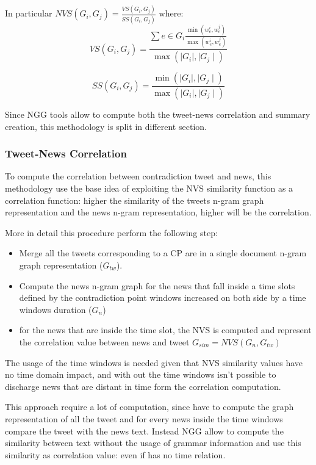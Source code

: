 In particular $NVS(G_i,G_j) = \frac{VS(G_i,G_j)}{SS(G_i,G_j)}$ where:
\begin{equation}
 VS(G_i,G_j)=\frac{\sum e \in G_i \frac{\min(w_e^i, w_e^j)}{\max(w_e^i, w_e^j)}}{\max(\mid G_i \mid, \mid G_j \mid)}
\end{equation}

\begin{equation}
 SS(G_i,G_j)=\frac{\min(\mid G_i \mid, \mid G_j \mid)}{\max(\mid G_i \mid, \mid G_j \mid)}
\end{equation}

Since NGG tools allow to compute both the tweet-news correlation and summary creation, this methodology is split in different section.

\subsubsection*{Tweet-News Correlation}
To compute the correlation between contradiction tweet and news, this methodology use the base idea of exploiting the NVS similarity function as a correlation function: higher the similarity of the tweets n-gram graph representation and the news n-gram representation, higher will be the correlation.

More in detail this procedure perform the following step:
\begin{itemize}
	\item Merge all the tweets corresponding to a CP are in a single document n-gram graph representation ($G_{tw}$).
	\item Compute the news n-gram graph for the news that fall inside a time slots defined by the contradiction point windows increased on both side by a time windows duration ($G_{n}$)
	\item for the news that are inside the time slot, the NVS is computed and represent the correlation value between news and tweet $G_{sim} = NVS(G_n, G_{tw})$
\end{itemize}

The usage of the time windows is needed given that NVS similarity values have no time domain impact, and with out the time windows isn't possible to  discharge news that are distant in time form the correlation computation.

This approach require a lot of computation, since have to compute the graph representation of all the tweet and for every news inside the time windows compare the tweet with the news text. Instead NGG allow to compute the similarity between text without the usage of grammar information and use this similarity as correlation value: even if has no time relation.


